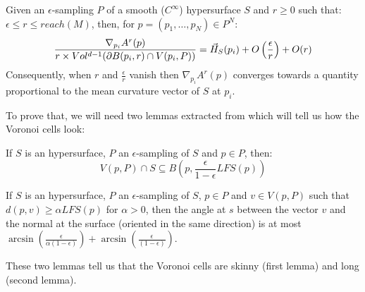 \begin{proposition}
    Given an $\epsilon$-sampling $ P $ of a smooth ($ C^{\infty} $) hypersurface
    $ S $ and $ r \ge 0 $ such that: $ \epsilon \leq r \leq reach(M) $, then,
    for $ p = (p_1, \ldots, p_N) \in P^N $:
    \begin{equation}
        \frac{\nabla_{p_i} A^r(p)}{r \times Vol^{d-1}(\partial B(p_i,r) \cap V(p_i,P))}
        = \vec{H}_{S}(p_i) + O \left(\frac{\epsilon}{r}\right) + O(r)
    \end{equation}
    Consequently, when $ r $ and $ \frac{\epsilon}{r} $ vanish then $
    \nabla_{p_i} A^r(p) $ converges towards a quantity proportional to the
    mean curvature vector of $ S $ at $ p_i $.
    \label{prop:gradient-mean-curvature}
\end{proposition}

To prove that, we will need two lemmas extracted from \cite{amenta1999surface}
which will tell us how the Voronoi cells look:
\begin{lemma}
    If $ S $ is an hypersurface, $ P $ an $\epsilon$-sampling of $ S $ and $ p
    \in P $, then:
    $$ V(p, P) \cap S \subseteq B\left(p, \frac{\epsilon}{1 - \epsilon}
        LFS(p)\right) $$
\end{lemma}

\begin{lemma}
    If $ S $ is an hypersurface, $ P $ an $\epsilon$-sampling of $ S $, $ p \in
    P $ and $ v \in V(p, P) $ such that $ d(p, v) \ge \alpha LFS(p) $ for $
    \alpha > 0 $, then the angle at $ s $ between the vector $ v $ and the
    normal at the surface (oriented in the same direction) is at most $
    \arcsin(\frac{\epsilon}{\alpha(1-\epsilon)}) +
    \arcsin(\frac{\epsilon}{(1-\epsilon)}) $.
\end{lemma}

These two lemmas tell us that the Voronoi cells are skinny (first lemma) and
long (second lemma).

